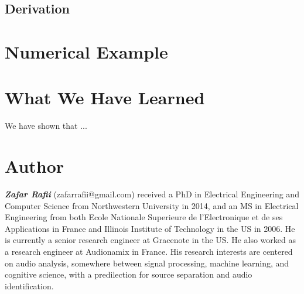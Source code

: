 \documentclass[journal]{IEEEtran}
\begin{document}
\subsection{Derivation}






\section{Numerical Example} %




\section{What We Have Learned}

We have shown that ...




\section{Author}

\textit{\textbf{Zafar Rafii}} (zafarrafii@gmail.com) received a PhD in Electrical Engineering and Computer Science from Northwestern University in 2014, and an MS in Electrical Engineering from both Ecole Nationale Superieure de l’Electronique et de ses Applications in France and Illinois Institute of Technology in the US in 2006. He is currently a senior research engineer at Gracenote in the US. He also worked as a research engineer at Audionamix in France. His research interests are centered on audio analysis, somewhere between signal processing, machine learning, and cognitive science, with a predilection for source separation and audio identification.



\end{document}
